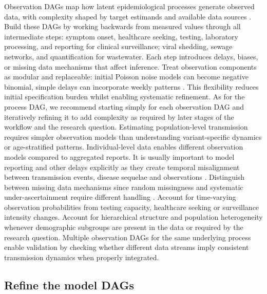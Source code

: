 \documentclass{article}
\begin{document}
Observation DAGs map how latent epidemiological processes generate observed data, with complexity shaped by target estimands and available data sources \citep{deangelis2018analysing}.
Build these DAGs by working backwards from measured values through all intermediate steps: symptom onset, healthcare seeking, testing, laboratory processing, and reporting for clinical surveillance; viral shedding, sewage networks, and quantification for wastewater.
Each step introduces delays, biases, or missing data mechanisms that affect inference.
Treat observation components as modular and replaceable: initial Poisson noise models can become negative binomial, simple delays can incorporate weekly patterns \citep{gelman2020bayesian}.
This flexibility reduces initial specification burden whilst enabling systematic refinement.
As for the process DAG, we recommend starting simply for each observation DAG and iteratively refining it to add complexity as required by later stages of the workflow and the research question.
Estimating population-level transmission requires simpler observation models than understanding variant-specific dynamics or age-stratified patterns.
Individual-level data enables different observation models compared to aggregated reports.
It is usually important to model reporting and other delays explicitly as they create temporal misalignment between transmission events, disease sequelae and observations \citep{seaman2022nowcasting}.
Distinguish between missing data mechanisms since random missingness and systematic under-ascertainment require different handling \citep{sherratt2021exploring}.
Account for time-varying observation probabilities from testing capacity, healthcare seeking or surveillance intensity changes.
Account for hierarchical structure and population heterogeneity whenever demographic subgroups are present in the data or required by the research question.
Multiple observation DAGs for the same underlying process enable validation by checking whether different data streams imply consistent transmission dynamics when properly integrated.

\subsection{Refine the model DAGs}
\end{document}

